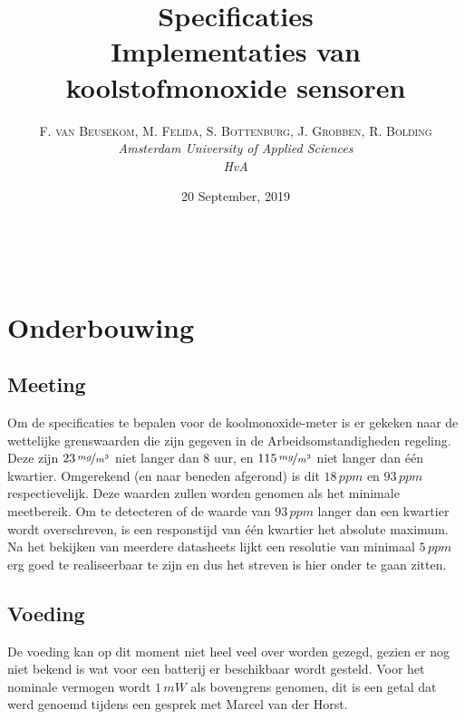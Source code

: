 \documentclass[a4paper, 11pt]{article} %
\title{\textbf{Specificaties}\\ %
Implementaties van koolstofmonoxide sensoren} %
\author{\textsc{F. van Beusekom, M. Felida, S. Bottenburg, J. Grobben, R. Bolding} %
\\{\textit{Amsterdam University of Applied Sciences\\ 
HvA}}} %
\date{20 September, 2019} %
\makeatletter
\renewcommand{\maketitle}{ %
\begin{flushright} %
{\LARGE\@title} %

\vspace{50pt} %

{\large\@author} %
\\\@date %

\vspace{40pt} %
\end{flushright}
}
\makeatother
\begin{document}
\captionsetup{justification=centering}
\hypersetup{hidelinks=true}
\maketitle %




\vspace{10pt} %

\newpage
\section{Onderbouwing}
\subsection{Meeting}
Om de specificaties te bepalen voor de koolmonoxide-meter is er gekeken naar de wettelijke grenswaarden die zijn gegeven in de Arbeidsomstandigheden regeling. Deze zijn $23\,\nicefrac{mg}{m^{3}}$ niet langer dan 8 uur, en $115\,\nicefrac{mg}{m^{3}}$ niet langer dan één kwartier. Omgerekend (en naar beneden afgerond) is dit $18\,ppm$ en $93\,ppm$ respectievelijk. Deze waarden zullen worden genomen als het minimale meetbereik. Om te detecteren of de waarde van $93\,ppm$ langer dan een kwartier wordt overschreven, is een responstijd van één kwartier het absolute maximum. Na het bekijken van meerdere datasheets lijkt een resolutie van minimaal $5\,ppm$ erg goed te realiseerbaar te zijn en dus het streven is hier onder te gaan zitten.
\subsection{Voeding}
De voeding kan op dit moment niet heel veel over worden gezegd, gezien er nog niet bekend is wat voor een batterij er beschikbaar wordt gesteld. Voor het nominale vermogen wordt $1\,mW$ als bovengrens genomen, dit is een getal dat werd genoemd tijdens een gesprek met Marcel van der Horst.
\end{document}
